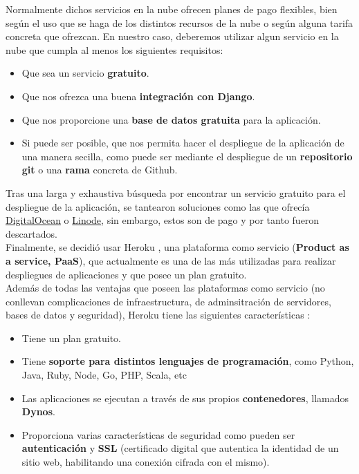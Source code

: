 Normalmente dichos servicios en la nube ofrecen planes de pago flexibles, bien según
el uso que se haga de los distintos recursos de la nube o según alguna tarifa concreta
que ofrezcan. En nuestro caso, deberemos utilizar algun servicio en la nube que cumpla
al menos los siguientes requisitos:

    \begin{itemize}
        \item Que sea un servicio \textbf{gratuito}.
        \item Que nos ofrezca una buena \textbf{integración con Django}.
        \item Que nos proporcione una \textbf{base de datos gratuita} para la aplicación.
        \item Si puede ser posible, que nos permita hacer el despliegue de la
        aplicación de una manera secilla, como puede ser mediante el despliegue de un
        \textbf{repositorio git} o una \textbf{rama} concreta de Github. 
    \end{itemize}

Tras una larga y exhaustiva búsqueda por encontrar un servicio gratuito para el
despliegue de la aplicación, se tantearon soluciones como las que ofrecía
\href{https://docs.digitalocean.com/tutorials/app-deploy-django-app/}{DigitalOcean}
o \href{https://www.linode.com/docs/products/tools/marketplace/guides/django/}{Linode},
sin embargo, estos son de pago y por tanto fueron descartados.\\

Finalmente, se decidió usar Heroku \cite{heroku}, una plataforma como servicio
(\textbf{Product as a service, PaaS}), que actualmente es una de las más utilizadas
para realizar despliegues de aplicaciones y que posee un plan gratuito.\\

Además de todas las ventajas que poseen las plataformas como servicio (no conllevan
complicaciones de infraestructura, de adminsitración de servidores, bases de datos y
seguridad), Heroku tiene las siguientes características \cite{heroku-features}:

    \begin{itemize}
        \item Tiene un plan gratuito.
        \item Tiene \textbf{soporte para distintos lenguajes de programación}, como Python,
        Java, Ruby, Node, Go, PHP, Scala, etc
        \item Las aplicaciones se ejecutan a través de sus propios \textbf{contenedores},
        llamados \textbf{Dynos}.
        \item Proporciona varias características de seguridad como pueden ser
        \textbf{autenticación} y \textbf{SSL} (certificado digital que autentica la
        identidad de un sitio web, habilitando una conexión cifrada con el mismo).
    \end{itemize}

